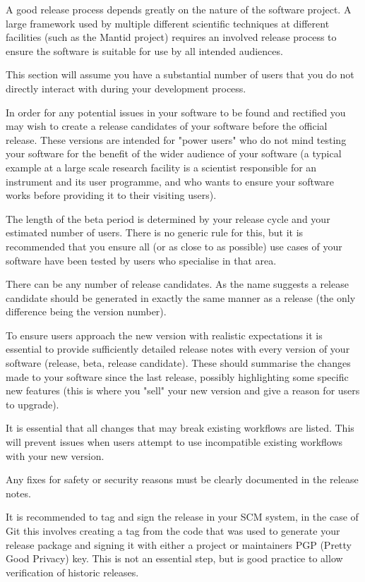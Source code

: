 \documentclass[jnr]{iosart2x}
\begin{document}
A good release process depends greatly on the nature of the software project.
A large framework used by multiple different scientific techniques at different facilities (such as the Mantid project) requires an involved release process to ensure the software is suitable for use by all intended audiences.

This section will assume you have a substantial number of users that you do not directly interact with during your development process.

In order for any potential issues in your software to be found and rectified you may wish to create a release candidates of your software before the official release.
These versions are intended for "power users" who do not mind testing your software for the benefit of the wider audience of your software (a typical example at a large scale research facility is a scientist responsible for an instrument and its user programme, and who wants to ensure your software works before providing it to their visiting users).

The length of the beta period is determined by your release cycle and your estimated number of users.
There is no generic rule for this, but it is recommended that you ensure all (or as close to as possible) use cases of your software have been tested by users who specialise in that area.

There can be any number of release candidates.
As the name suggests a release candidate should be generated in exactly the same manner as a release (the only difference being the version number).

To ensure users approach the new version with realistic expectations it is essential to provide sufficiently detailed release notes with every version of your software (release, beta, release candidate).
These should summarise the changes made to your software since the last release, possibly highlighting some specific new features (this is where you "sell" your new version and give a reason for users to upgrade).

It is essential that all changes that may break existing workflows are listed.
This will prevent issues when users attempt to use incompatible existing workflows with your new version.

Any fixes for safety or security reasons must be clearly documented in the release notes.

It is recommended to tag and sign the release in your SCM system, in the case of Git this involves creating a tag from the code that was used to generate your release package and signing it with either a project or maintainers PGP (Pretty Good Privacy) key.
This is not an essential step, but is good practice to allow verification of historic releases.
\end{document}
